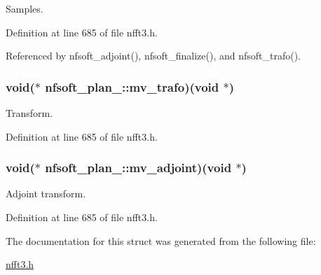 Samples. 



Definition at line 685 of file nfft3.\-h.



Referenced by nfsoft\-\_\-adjoint(), nfsoft\-\_\-finalize(), and nfsoft\-\_\-trafo().

\hypertarget{structnfsoft__plan___ae7c72bdbce93cb99dcbd14d764d08502}{
\subsubsection[{mv\-\_\-trafo}]{\setlength{\rightskip}{0pt plus 5cm}void($\ast$ nfsoft\-\_\-plan\-\_\-\-::mv\-\_\-trafo)(void $\ast$)}}\label{structnfsoft__plan___ae7c72bdbce93cb99dcbd14d764d08502}


Transform. 



Definition at line 685 of file nfft3.\-h.

\hypertarget{structnfsoft__plan___a33d5fb830b3021ddb85320139be034b8}{
\subsubsection[{mv\-\_\-adjoint}]{\setlength{\rightskip}{0pt plus 5cm}void($\ast$ nfsoft\-\_\-plan\-\_\-\-::mv\-\_\-adjoint)(void $\ast$)}}\label{structnfsoft__plan___a33d5fb830b3021ddb85320139be034b8}


Adjoint transform. 



Definition at line 685 of file nfft3.\-h.



The documentation for this struct was generated from the following file\-:\begin{DoxyCompactItemize}
\item 
\hyperlink{nfft3_8h}{nfft3.\-h}\end{DoxyCompactItemize}
